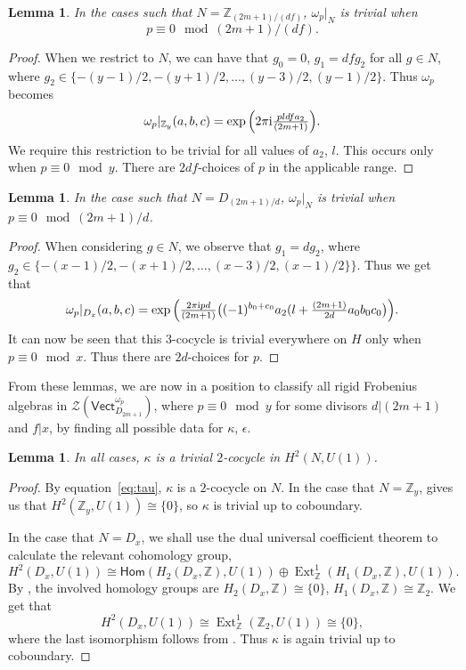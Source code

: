 \documentclass[10pt,a4paper]{amsart}
\numberwithin{equation}{section}
\newtheorem{Lemma}[Theorem]{Lemma}
\newcommand{\Ext}{\operatorname{Ext}}
\newcommand{\Hom}{\mathsf{Hom}}
\newcommand{\Vect}{\mathsf{Vect}}
\newcommand{\mZ}{\mathbb{Z}}
\newcommand{\cZ}{\mathcal{Z}}
\begin{document}
\begin{Lemma}
 In the cases such that $N= \mZ_{(2m+1)/(df)}$, $\omega_p|_N$ is trivial when
 \[p\equiv 0 \mod (2m+1)/(df).\]
\end{Lemma}
\begin{proof}
When we restrict to $N$, we can have that $g_0=0$, $g_1 = df g_2$ for all $g\in N$, where $g_2\in \lbrace -(y-1)/2, -(y+1)/2,\dots ,(y-3)/2 ,(y-1)/2 \rbrace$. Thus $\omega_p$ becomes \[\omega_p|_{\mZ_y}(a,b,c) = \exp\Big(2 \pi {\rm i}\tfrac{p l d f a_2}{(2m+1)} \Big).
\]
We require this restriction to be trivial for all values of $a_2$, $l$. This occurs only when $p\equiv 0 \mod y$. There are $2df$-choices of $p$ in the applicable range.
\end{proof}

\begin{Lemma}
In the case such that $N= D_{(2m+1)/d}$, $\omega_p|_N$ is trivial when $p\equiv 0 \mod (2m+1)/d$.
\end{Lemma}

\begin{proof} When considering $g\in N$, we observe that $g_1 = dg_2$, where $g_2\in \lbrace -(x-1)/2, -(x+1)/2,\dots ,(x-3)/2 ,(x-1)/2 \rbrace \rbrace$.
 Thus we get that
 \begin{equation*}
 \omega_p|_{D_x}(a,b,c) =\exp\Big(\tfrac{2\pi {\rm i} p d}{(2m+1)}\big((-1)^{b_0+c_0}a_2(l + \tfrac{(2m+1)}{2 d}a_0b_0c_0\big) \Big).
 \end{equation*}
 It can now be seen that this $3$-cocycle is trivial everywhere on $H$ only when $p\equiv 0 \mod x$. Thus there are $2d$-choices for $p$.
\end{proof}

From these lemmas, we are now in a position to classify all rigid Frobenius algebras in $\cZ(\Vect^{\omega_p}_{D_{2m+1}})$, where $p \equiv 0 \mod y$ for some divisors $d|(2m+1)$ and $f|x$, by finding all possible data for $\kappa$, $\epsilon$.
\begin{Lemma}
 In all cases, $\kappa$ is a trivial $2$-cocycle in $H^2(N,U(1))$.
\end{Lemma}
\begin{proof}
 By equation~\eqref{eq:tau}, $\kappa$ is a $2$-cocycle on $N$. In the case that $N=\mZ_{y}$, \cite[equation~2.3.14]{dWP} gives us that $H^2(\mZ_y,U(1)) \cong \{0\}$, so $\kappa$ is trivial up to coboundary.

In the case that $N=D_x$, we shall use the dual universal coefficient theorem \cite[Theorem~3.6.5]{Wei} to calculate the relevant cohomology group,
 \[H^2(D_x,U(1)) \cong \Hom(H_2(D_x,\mZ),U(1)) \oplus \Ext^1_{\mZ}(H_1(D_x,\mZ),U(1)).\]
By \cite[Example~6.8.5]{Wei}, the involved homology groups are $H_2(D_x,\mZ) \cong \lbrace 0 \rbrace$, $H_1(D_x,\mZ) \cong \mZ_2$. We get that \[H^2(D_x,U(1)) \cong \Ext^1_{\mZ}(\mZ_2,U(1)) \cong \lbrace 0\rbrace,\]
where the last isomorphism follows from \cite[Corollary 3.3.11]{Wei}. Thus $\kappa$ is again trivial up to coboundary.
\end{proof}
\end{document}
